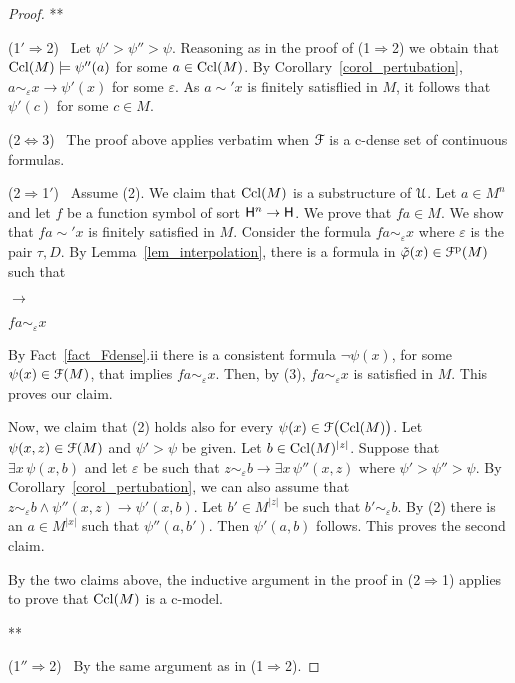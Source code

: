 \documentclass{amsproc}
\begin{document}
{\begin{proof}
\hfil***

  (1$'\!\Rightarrow$2) \ 
  Let $\psi'>\psi''>\psi$.
  Reasoning as in the proof of (1$\Rightarrow$2) we obtain that ${\rm Ccl}(M)\models\psi''(a)$ for some $a\in{\rm Ccl}(M)$.
  By Corollary~\ref{corol_pertubation}, $a\sim_\varepsilon x\rightarrow\psi'(x)$ for some $\varepsilon$.
  As $a\sim'x$ is finitely satisflied in $M$, it follows that $\psi'(c)$ for some $c\in M$.

  (2$\Leftrightarrow$3) \ 
  The proof above applies verbatim when ${\EuScript F}$ is a c-dense set of continuous formulas.
  
  (2$\Rightarrow$1$'$) \ 
  Assume (2).
  We claim that ${\rm Ccl}(M)$ is a substructure of ${\EuScript U}$.  
  Let $a\in M^{n}$ and let $f$ be a function symbol of sort ${\sf H}^{n}\to{\sf H}$.
  We prove that $fa\in M$.
  We show that $fa\sim' x$ is finitely satisfied in $M$.
  Consider the formula $fa\sim_\varepsilon  x$ where $\varepsilon$ is the pair $\tau,D$.
  By Lemma~\ref{lem_interpolation}, there is a formula in $\tilde\varphi(x)\in{\EuScript F}^{\rm p}(M)$ such that
  
  \ceq{\hfill fa\sim_\tau x}{\rightarrow}{\neg\tilde\varphi(x)}\parbox{6ex}{\hfil$\rightarrow$}$fa\sim_\varepsilon  x$

  By Fact~\ref{fact_Fdense}.ii there is a consistent formula  $\neg\psi(x)$, for some $\psi(x)\in{\EuScript F}(M)$, that implies $fa\sim_\varepsilon  x$.
  Then, by (3), $fa\sim_\varepsilon  x$ is satisfied in $M$.
  This proves our claim.

  Now, we claim that (2) holds also for every $\psi(x)\in{\EuScript F}\big({\rm Ccl}(M)\big)$.
  Let $\psi(x,z)\in{\EuScript F}(M)$ and $\psi'>\psi$ be given.
  Let $b\in{\rm Ccl}(M)^{|z|}$.
  Suppose that $\exists x\,\psi(x,b)$ and let $\varepsilon$ be such that $z\sim_\varepsilon b\rightarrow\exists x\,\psi''(x,z)$ where $\psi'>\psi''>\psi$.
  By Corollary~\ref{corol_pertubation}, we can also assume that $z\sim_\varepsilon b\wedge\psi''(x,z)\rightarrow\psi'(x,b)$. 
  Let $b'\in M^{|z|}$ be such that $b'\sim_\varepsilon b$.
  By (2) there is an $a\in M^{|x|}$ such that $\psi''(a,b')$.
  Then $\psi'(a,b)$ follows.
  This proves the second claim.

  By the two claims above, the inductive argument in the proof in (2$\Rightarrow$1) applies to prove that ${\rm Ccl}(M)$ is a c-model.

  \hfil***

  (1$''\!\Rightarrow$2) \ 
  By the same argument as in (1$\Rightarrow$2).



\end{proof}}
\end{document}
